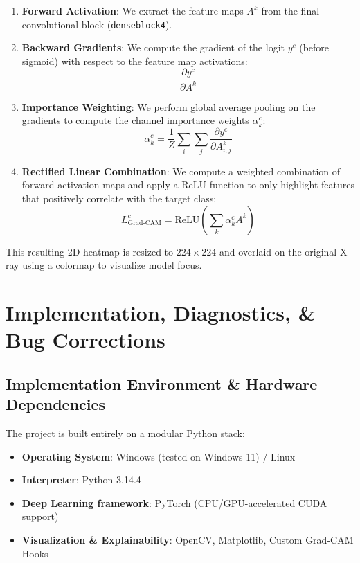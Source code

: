 \documentclass[12pt,oneside]{report}
\begin{document}
\begin{enumerate}
    \item \textbf{Forward Activation}: We extract the feature maps $A^k$ from the final convolutional block (\texttt{denseblock4}).
    \item \textbf{Backward Gradients}: We compute the gradient of the logit $y^c$ (before sigmoid) with respect to the feature map activations:
    \begin{equation}
    \frac{\partial y^c}{\partial A^k}
    \end{equation}
    \item \textbf{Importance Weighting}: We perform global average pooling on the gradients to compute the channel importance weights $\alpha_k^c$:
    \begin{equation}
    \alpha_k^c = \frac{1}{Z} \sum_{i} \sum_{j} \frac{\partial y^c}{\partial A_{i,j}^k}
    \end{equation}
    \item \textbf{Rectified Linear Combination}: We compute a weighted combination of forward activation maps and apply a ReLU function to only highlight features that positively correlate with the target class:
    \begin{equation}
    L_{\text{Grad-CAM}}^c = \text{ReLU}\left(\sum_{k} \alpha_k^c A^k\right)
    \end{equation}
\end{enumerate}
This resulting 2D heatmap is resized to $224\times224$ and overlaid on the original X-ray using a colormap to visualize model focus.

\chapter{Implementation, Diagnostics, \& Bug Corrections}

\section{Implementation Environment \& Hardware Dependencies}
The project is built entirely on a modular Python stack:
\begin{itemize}[label=\textbullet]
    \item \textbf{Operating System}: Windows (tested on Windows 11) / Linux
    \item \textbf{Interpreter}: Python 3.14.4
    \item \textbf{Deep Learning framework}: PyTorch (CPU/GPU-accelerated CUDA support)
    \item \textbf{Visualization \& Explainability}: OpenCV, Matplotlib, Custom Grad-CAM Hooks
\end{itemize}
\end{document}

